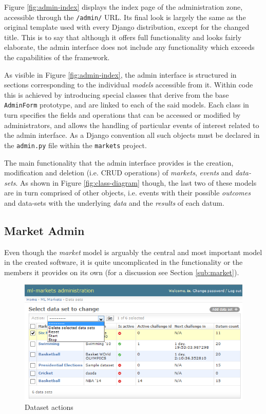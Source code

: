 \documentclass[bsc,frontabs,twoside,singlespacing,parskip,deptreport]{infthesis}     %
\begin{document}
\begin{itemize}
	Figure \ref{fig:admin-index} displays the index page of the administration zone, accessible through the {\tt /admin/} URL. Its final look is largely the same as the original template used with every Django distribution, except for the changed title. This is to say that although it offers full functionality and looks fairly elaborate, the admin interface does not include any functionality which exceeds the capabilities of the framework. 

	As visible in Figure \ref{fig:admin-index}, the admin interface is structured in sections corresponding to the individual {\it models} accessible from it. Within code this is achieved by introducing special classes that derive from the base {\tt AdminForm} prototype, and are linked to each of the said models. Each class in turn specifies the fields and operations that can be accessed or modified by administrators, and allows the handling of particular events of interest related to the admin interface. As a Django convention all such objects must be declared in the {\tt admin.py} file within the {\tt markets} project. 

	The main functionality that the admin interface provides is the creation, modification and deletion (i.e. CRUD operations) of {\it markets}, {\it events} and {\it data-sets}. As shown in Figure \ref{fig:class-diagram} though, the last two of these models are in turn comprised of other objects, i.e. events with their possible {\it outcomes} and data-sets with the underlying {\it data} and the {\it results} of each datum. 

\subsection{Market Admin}

	Even though the {\it market} model is arguably the central and most important model in the created software, it is quite uncomplicated in the functionality or the members it provides on its own (for a discussion see Section \ref{sub:market}).  


\begin{figure}
\caption{Dataset actions}
 \includegraphics[width=\textwidth]{figures/admin-dataset-actions(c).png}


\end{figure}
\end{itemize}
\end{document}
